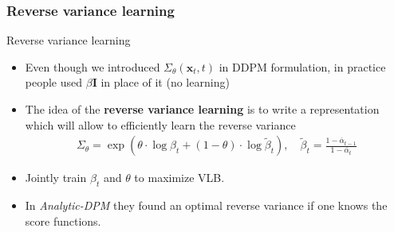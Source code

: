 \documentclass{beamer}
\begin{document}
\subsubsection{Reverse variance learning}
\begin{frame}{Reverse variance learning}
\begin{itemize}
  \item Even though we introduced $\Sigma_\theta (\mathbf{x}_t, t)$ in DDPM formulation, in practice people used $\beta \mathbf{I}$ in place of it (no learning)
  \item The idea of the \textbf{reverse variance learning} is to write a representation which will allow to efficiently learn the reverse variance 
  \begin{align}
    \Sigma_\theta = \exp(\theta \cdot \log \beta_t + (1-\theta)\cdot \log \tilde{\beta}_t), \quad \tilde{\beta}_t = \frac{1-\overline{\alpha}_{t-1}}{1-\overline{\alpha}_{t}}
  \end{align}
  \item Jointly train $\beta_t$ and $\theta$ to maximize VLB.
  \item In \textit{Analytic-DPM} they found an optimal reverse variance if one knows the score functions. 
\end{itemize}
\end{frame}
\end{document}
